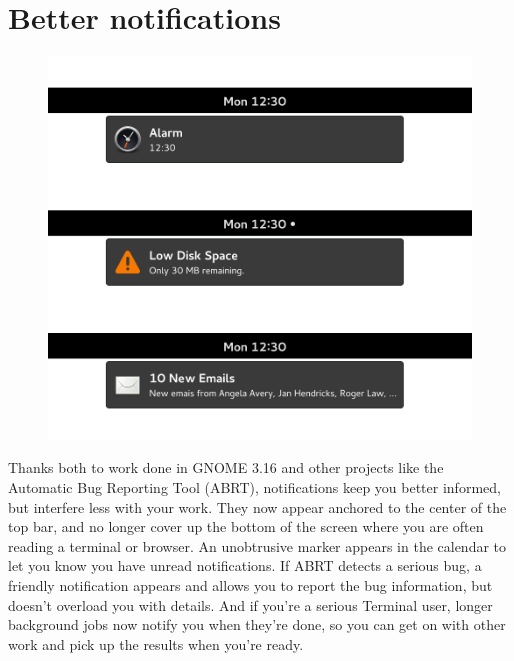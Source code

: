 \documentclass[
letterpaper,
10pt
]{leaflet}
\begin{document}
\section{\textcolor{FedoraBlue}{Better notifications}}
\begin{figure}[h]
  \includegraphics[keepaspectratio,width=\textwidth]{notifications-f22-cropped.png}
\end{figure}
Thanks both to work done in GNOME 3.16 and other projects like the Automatic Bug Reporting Tool (ABRT), notifications keep you better informed, but interfere less with your work. They now appear anchored to the center of the top bar, and no longer cover up the bottom of the screen where you are often reading a terminal or browser. An unobtrusive marker appears in the calendar to let you know you have unread notifications. If ABRT detects a serious bug, a friendly notification appears and allows you to report the bug information, but doesn't overload you with details. And if you're a serious Terminal user, longer background jobs now notify you when they're done, so you can get on with other work and pick up the results when you're ready. 
\end{document}
